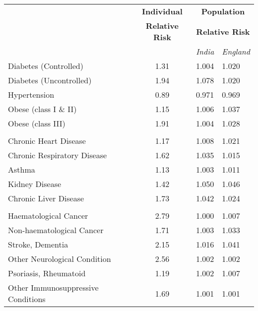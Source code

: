 \begin{tabular}{p{7cm}cp{1.25cm}p{1.5cm}}
& \textbf{{\footnotesize Individual}} &
  \multicolumn{2}{c}{{\textbf{\footnotesize{Population}}}} \\
& \textbf{{\footnotesize Relative Risk}} &
  \multicolumn{2}{c}{{\textbf{\footnotesize{Relative Risk}}}} \\[0.75ex]
  & & \emph{India} & \emph{England} \\[2ex]
Diabetes (Controlled) & \num{1.31} & \num{1.004} & \num{1.020} \\[0.25ex]
Diabetes (Uncontrolled) & \num{1.94} & \num{1.078} & \num{1.020} \\[0.25ex]
Hypertension & \num{0.89} & \num{0.971} & \num{0.969} \\[0.25ex]
Obese (class I \& II) & \num{1.15} & \num{1.006} & \num{1.037} \\[0.25ex]
Obese (class III) & \num{1.91} & \num{1.004} & \num{1.028} \\[0.25ex]
\\
Chronic Heart Disease & \num{1.17} & \num{1.008} & \num{1.021} \\[0.25ex]
Chronic Respiratory Disease & \num{1.62} & \num{1.035} & \num{1.015} \\[0.25ex]
Asthma & \num{1.13} & \num{1.003} & \num{1.011} \\[0.25ex]
Kidney Disease & \num{1.42} & \num{1.050} & \num{1.046} \\[0.25ex]
Chronic Liver Disease & \num{1.73} & \num{1.042} & \num{1.024} \\[0.25ex]
\\
Haematological Cancer & \num{2.79} & \num{1.000} & \num{1.007} \\[0.25ex]
Non-haematological Cancer & \num{1.71} & \num{1.003} & \num{1.033} \\[0.25ex]
Stroke, Dementia & \num{2.15} & \num{1.016} & \num{1.041} \\[0.25ex]
Other Neurological Condition & \num{2.56} & \num{1.002} & \num{1.002} \\[0.25ex]
Psoriasis, Rheumatoid & \num{1.19} & \num{1.002} & \num{1.007} \\[0.25ex]
Other Immunosuppressive Conditions & \num{1.69} & \num{1.001} & \num{1.001} \\[0.25ex]
\end{tabular}

